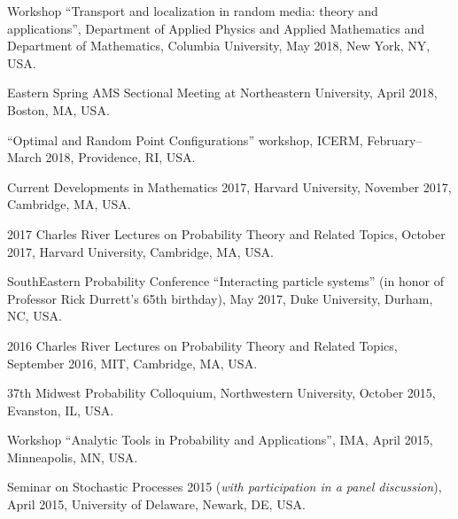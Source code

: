 \documentclass[letterpaper,11pt]{article}
\begin{document}
\begin{etaremune}
	\item 
		Workshop ``Transport and localization in random media: theory and applications'',
		Department of Applied Physics and Applied Mathematics and Department of Mathematics,
		Columbia University, 
		May 2018, 
		New York, NY, USA.
	\item 
		Eastern Spring AMS Sectional Meeting at Northeastern University,
	      April 2018, Boston, MA, USA.
	\item
		``Optimal and Random Point Configurations'' workshop, ICERM, February--March 2018, Providence, RI,
	      USA.
	\item 
		Current Developments in Mathematics 2017, Harvard University, November 2017, Cambridge, MA, USA.
	\item
	      2017 Charles River Lectures on Probability Theory and Related
	      Topics, October 2017, Harvard University, Cambridge, MA, USA.
	\item
	      SouthEastern Probability Conference ``Interacting particle
	      systems'' (in honor of Professor Rick Durrett's 65th birthday), May 2017, Duke
	      University, Durham, NC, USA.

	\item
	      2016 Charles River Lectures on Probability Theory and Related
	      Topics, September 2016, MIT, Cambridge, MA, USA.


	\item
	      37th Midwest Probability Colloquium, Northwestern University,
	      October 2015, Evanston, IL, USA.

	\item
	      Workshop ``Analytic Tools in Probability and Applications'',
	      IMA, April 2015, Minneapolis, MN, USA.

	\item
	      Seminar on Stochastic Processes 2015 (\emph{with participation
		      in a panel discussion}), April 2015, University of Delaware, Newark, DE, USA.


\end{etaremune}
\end{document}
